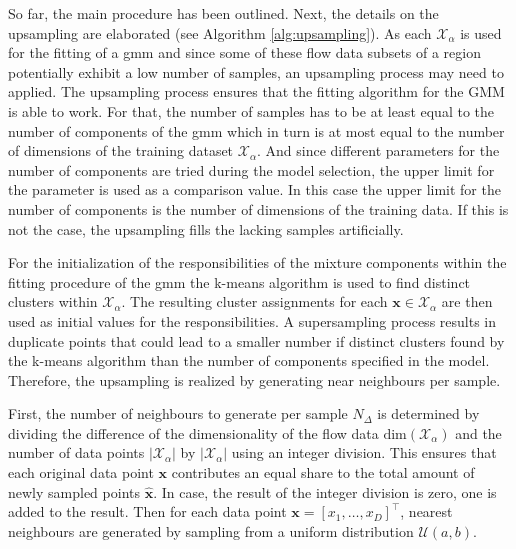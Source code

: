 \documentclass[../../main.tex]{subfiles}
\begin{document}
 So far, the main procedure has been outlined. Next, the details on the upsampling are elaborated (see Algorithm \ref{alg:upsampling}). As each $\mathcal{X}_\alpha$ is used for the fitting of a \gls{gmm} and since some of these flow data subsets of a region potentially exhibit a low number of samples, an upsampling process may need to applied. The upsampling process ensures that the fitting algorithm for the GMM is able to work. For that, the number of samples has to be at least equal to the number of components of the \gls{gmm} which in turn is at most equal to the number of dimensions of the training dataset $\mathcal{X}_\alpha$. And since different parameters for the number of components are tried during the model selection, the upper limit for the parameter is used as a comparison value. In this case the upper limit for the number of components is the number of dimensions of the training data. If this is not the case, the upsampling fills the lacking samples artificially. 

 For the initialization of the responsibilities of the mixture components within the fitting procedure of the \gls{gmm} the k-means algorithm is used to find distinct clusters within $\mathcal{X}_\alpha$. The resulting cluster assignments for each $\bm{x} \in \mathcal{X}_\alpha$ are then used as initial values for the responsibilities. A supersampling process results in duplicate points that could lead to a smaller number if distinct clusters found by the k-means algorithm than the number of components specified in the model. Therefore, the upsampling is realized by generating near neighbours per sample.

 First, the number of neighbours to generate per sample $N_\Delta$ is determined by dividing the difference of the dimensionality of the flow data $\text{dim}(\mathcal{X}_\alpha)$ and the number of data points $|\mathcal{X}_\alpha|$ by $|\mathcal{X}_\alpha|$ using an integer division. This ensures that each original data point $\bm{x}$ contributes an equal share to the total amount of newly sampled points $\hat{\bm{x}}$. In case, the result of the integer division is zero, one is added to the result. Then for each data point $\bm{x} = [x_1, \dots, x_D]^\top$, nearest neighbours are generated by sampling from a uniform distribution $\mathcal{U}(a, b)$. 
\end{document}
